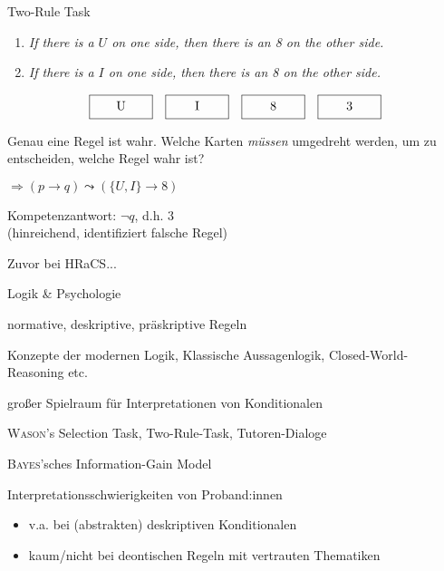 \begin{frame}{Two-Rule Task {\scriptsize \cite[S.~61-63]{stenningHumanReasoningCognitive2008}}}
    \begin{enumerate}
        \item \emph{If there is a $U$ on one side, then there is an 8 on the other side.}
        \item \emph{If there is a $I$ on one side, then there is an 8 on the other side.}
    \end{enumerate}

    \[
        \framebox[5em][c]{U\strut}\quad
        \framebox[5em][c]{I\strut}\quad
        \framebox[5em][c]{8\strut}\quad
        \framebox[5em][c]{3\strut}
    \]

    Genau eine Regel ist wahr. Welche Karten \emph{müssen} umgedreht werden, um zu entscheiden, welche Regel wahr ist?

    $\Rightarrow (p \to q) \leadsto (\{U, I\} \to 8)$

    Kompetenzantwort: $\lnot q$, d.h. $3$\\
    {\footnotesize (hinreichend, identifiziert falsche Regel)}
\end{frame}


\begin{frame}{Zuvor bei HRaCS...}
    \begin{itemize}
        {
            \color{gray}

            \item Logik \& Psychologie
            \item normative, deskriptive, präskriptive Regeln
            
            \item Konzepte der modernen Logik, Klassische Aussagenlogik, Closed-World-Reasoning etc.
            \item großer Spielraum für Interpretationen von Konditionalen
        }

        \item \textsc{Wason}'s Selection Task, Two-Rule-Task, Tutoren-Dialoge
        \item \textsc{Bayes}'sches Information-Gain Model
        \pause

        \item[$\Rightarrow$] \alert{Interpretationsschwierigkeiten} von Proband:innen
        \begin{itemize}
            \item v.a. bei (abstrakten) deskriptiven Konditionalen
            \item kaum/nicht bei deontischen Regeln mit vertrauten Thematiken
        \end{itemize}
    \end{itemize}
\end{frame}
